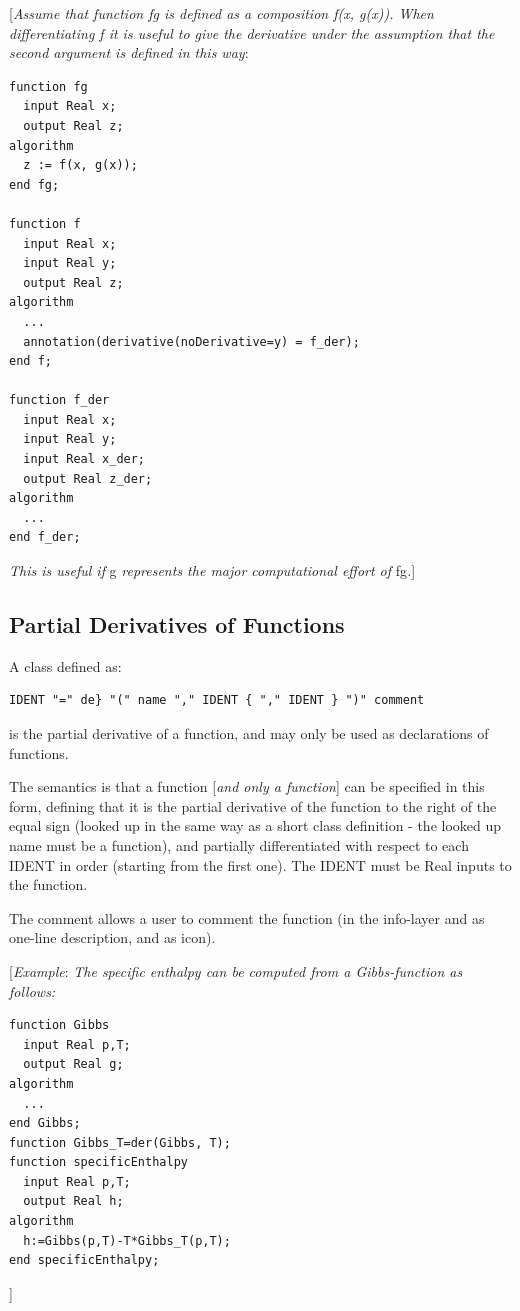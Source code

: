 \documentclass[10pt,a4paper]{report}
\def\doublelabel#1{\label{#1}}
\begin{document}
{[}\emph{Assume that function fg is defined as a composition f(x, g(x)).
When differentiating f it is useful to give the derivative under the
assumption that the second argument is defined in this way}:

\begin{lstlisting}[language=modelica]
function fg
  input Real x;
  output Real z;
algorithm
  z := f(x, g(x));
end fg;

function f
  input Real x;
  input Real y;
  output Real z;
algorithm
  ...
  annotation(derivative(noDerivative=y) = f_der);
end f;

function f_der
  input Real x;
  input Real y;
  input Real x_der;
  output Real z_der;
algorithm
  ...
end f_der;
\end{lstlisting}
\emph{This is useful if} g \emph{represents the major computational
effort of} fg\emph{.}{]}

\subsection{Partial Derivatives of Functions}\doublelabel{partial-derivatives-of-functions}

A class defined as:
\begin{lstlisting}[language=grammar]
IDENT "=" de} "(" name "," IDENT { "," IDENT } ")" comment
\end{lstlisting}

is the partial derivative of a function, and may only be used as
declarations of functions.

The semantics is that a function {[}\emph{and only a function}{]} can be
specified in this form, defining that it is the partial derivative of
the function to the right of the equal sign (looked up in the same way
as a short class definition - the looked up name must be a function),
and partially differentiated with respect to each IDENT in order
(starting from the first one). The IDENT must be Real inputs to the
function.

The comment allows a user to comment the function (in the info-layer and
as one-line description, and as icon).

{[}\emph{Example}: \emph{The specific enthalpy can be computed from a
Gibbs-function as follows:}

\begin{lstlisting}[language=modelica]
function Gibbs
  input Real p,T;
  output Real g;
algorithm
  ...
end Gibbs;
function Gibbs_T=der(Gibbs, T);
function specificEnthalpy
  input Real p,T;
  output Real h;
algorithm
  h:=Gibbs(p,T)-T*Gibbs_T(p,T);
end specificEnthalpy;
\end{lstlisting}
{]}
\end{document}
